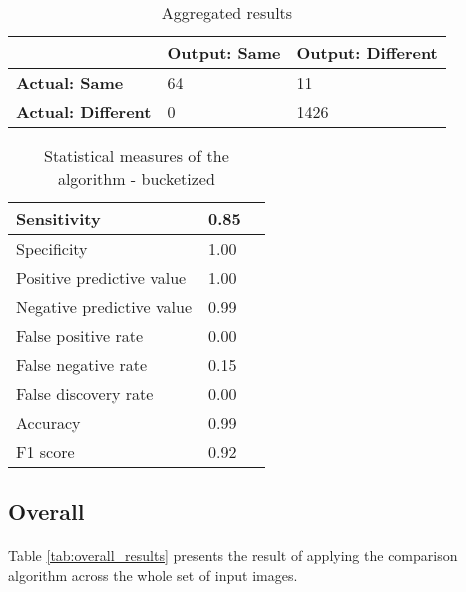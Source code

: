 \begin{table}[H]
    \centering
	\begin{spacing}{1.5}
    \begin{tabular}{|l|l|l|}
        \hline
        \cellcolor{gray} & \textbf{Output: Same} & \textbf{Output: Different} \\ [0.5ex]
        \hline\hline
        \textbf{Actual: Same} & 64 & 11 \\ [0.5ex]
        \hline
        \textbf{Actual: Different} & 0 & 1426 \\ [0.5ex]
        \hline
    \end{tabular}
    \end{spacing}
    \caption{Aggregated results}
    \label{tab:bucketized_results}
\end{table}
        
\begin{table}[H]
    \centering
	\begin{spacing}{1.5}    
    \begin{tabular}{|l|l|l|}
        \hline
        Sensitivity                 & 0.85 \\
        \hline
        Specificity                 & 1.00 \\
        \hline
        Positive predictive value   & 1.00 \\
        \hline
        Negative predictive value   & 0.99 \\
        \hline
        False positive rate         & 0.00 \\
        \hline
        False negative rate         & 0.15 \\
        \hline
        False discovery rate        & 0.00 \\
        \hline
        Accuracy                    & 0.99 \\
        \hline
        F1 score                    & 0.92 \\
        \hline
    \end{tabular}
    \end{spacing}
    \caption{Statistical measures of the algorithm - bucketized}
\end{table}

\subsection{Overall}
\paragraph{}
Table \ref{tab:overall_results} presents the result of applying the comparison algorithm across the whole set of input images.

